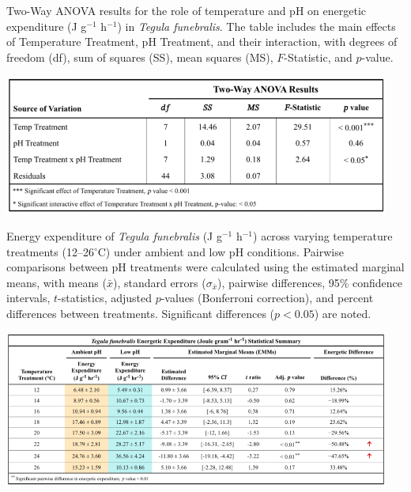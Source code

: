 \documentclass{CSUNthesis}
\begin{document}
\newpage

\begin{table}[H]
\caption[Two-Way ANOVA for energetic expenditure.]{Two-Way ANOVA results for the role of temperature and pH on energetic expenditure (J g$^{-1}$ h$^{-1}$) in \textit{Tegula funebralis}. The table includes the main effects of Temperature Treatment, pH Treatment, and their interaction, with degrees of freedom (df), sum of squares (SS), mean squares (MS), $F$-Statistic, and $p$-value.}
\centering
\includegraphics[width=5in]{figures/appendix/Appendix_6_Joule_ANOVA.png}
\label{tab:appendixB5}
\end{table}

\newpage

\begin{table}[H]
\caption[Pairwise energy expenditure differences across pH treatments.]{Energy expenditure of \textit{Tegula funebralis} (J g$^{-1}$ h$^{-1}$) across varying temperature treatments (12–26$^\circ$C) under ambient and low pH conditions. Pairwise comparisons between pH treatments were calculated using the estimated marginal means, with means ($\bar{x}$), standard errors ($\sigma_{\bar{x}}$), pairwise differences, 95\% confidence intervals, $t$-statistics, adjusted $p$-values (Bonferroni correction), and percent differences between treatments. Significant differences ($p < 0.05$) are noted.}
\centering
\includegraphics[width=5in]{figures/appendix/Appendix_7_J_Table.png}
\label{tab:appendixB6}
\end{table}

\backmatter
\end{document}
